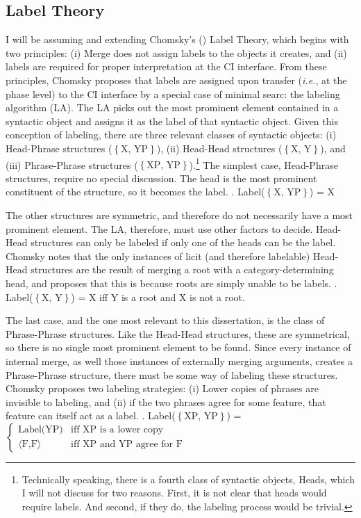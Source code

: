 \documentclass[letterpaper,12pt]{article}
\newcommand{\hxp}{$\left\{ \text{X, YP} \right\}$}
\newcommand{\hh}{$\left\{ \text{X, Y} \right\}$}
\newcommand{\xpyp}{$\left\{ \text{XP, YP} \right\}$}
\begin{document}
\subsection{Label Theory}
I will be assuming and extending Chomsky's (\citeyear{chomsky2013problems,chomsky2015problems}) Label Theory, which begins with two principles: (i) Merge does not assign labels to the objects it creates, and (ii) labels are required for proper interpretation at the CI interface.
From these principles, Chomsky proposes that labels are assigned upon transfer (\textit{i.e.}, at the phase level) to the CI interface by a special case of minimal searc: the labeling algorithm (LA).
The LA picks out the most prominent element contained in a syntactic object and assigns it as the label of that syntactic object.
Given this conception of labeling, there are three relevant classes of syntactic objects: (i) Head-Phrase structures ($\left\{ \text{X, YP} \right\}$), (ii) Head-Head structures ($\left\{ \text{X, Y} \right\}$), and (iii) Phrase-Phrase structures ($\left\{ \text{XP, YP} \right\}$).\footnote{
  Technically speaking, there is a fourth class of syntactic objects, Heads, which I will not discuss for two reasons. 
  First, it is not clear that heads would require labels. 
  And second, if they do, the labeling process would be trivial.
}
The simplest case, Head-Phrase structures, require no special discussion.
The head is the most prominent constituent of the structure, so it becomes the label.
\ex.\label{ex:hxp_rule} Label(\hxp) = X

The other structures are symmetric, and therefore do not necessarily have a most prominent element.
The LA, therefore, must use other factors to decide.
Head-Head structures can only be labeled if only one of the heads can be the label.
Chomsky notes that the only instances of licit (and therefore labelable) Head-Head structures are the result of merging a root with a category-determining head, and proposes that this is because roots are simply unable to be labels.
\ex.\label{ex:hh_rule} Label(\hh) = X iff Y is a root and X is not a root.

The last case, and the one most relevant to this dissertation, is the class of Phrase-Phrase structures.
Like the Head-Head structures, these are symmetrical, so there is no single most prominent element to be found.
Since every instance of internal merge, as well those instances of externally merging arguments, creates a Phrase-Phrase structure, there must be some way of labeling these structures.
Chomsky proposes two labeling strategies: (i) Lower copies of phrases are invisible to labeling, and (ii) if the two phrases agree for some feature, that feature can itself act as a label.
\ex.\label{ex:xpyp_rule} Label(\xpyp) = $
\begin{cases}
  \text{Label(YP)} & \text{iff XP is a lower copy}\\
  \langle\text{F,F}\rangle & \text{iff XP and YP agree for F}
\end{cases}
$
\end{document}
